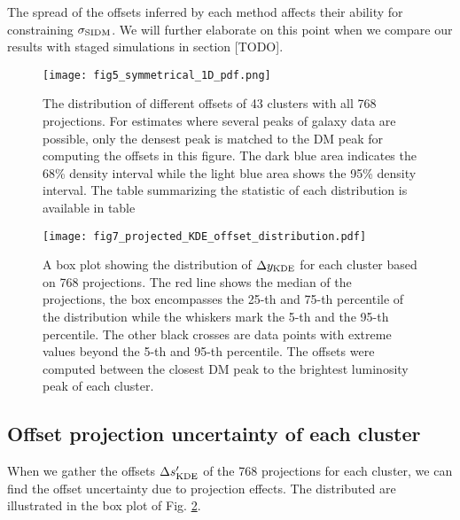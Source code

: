 The spread of the offsets inferred by each method affects their ability
for constraining $\sigma_{\rm SIDM}$. We will further elaborate on this point
when we compare our results with staged simulations in section [TODO]. 

\begin{figure*}
	\begin{center}
	\texttt{[image: fig5\_symmetrical\_1D\_pdf.png]}
	\caption{ 		
		The distribution of different offsets of 43 clusters with all 768
		projections. For estimates where several peaks of galaxy data are 
		possible, only the densest peak is matched to the DM peak for computing
		the offsets in this figure. 
		The dark blue area indicates the 68\% density interval
		while the light blue area shows the 95\% density interval. 
		The table summarizing the statistic of each distribution is available in
		table 
		\label{fig:offset_distributions}
	}
\end{center}
\end{figure*}

\begin{figure*}
	\begin{center}
	\texttt{[image: fig7\_projected\_KDE\_offset\_distribution.pdf]}
	\caption{A box plot showing the distribution of $\Delta y_{\rm KDE}$ for each cluster 
		based on 768 projections. The red line shows the median of the projections,
		the box encompasses the 25-th and 75-th percentile of the distribution while
		the whiskers mark the 5-th and the 95-th percentile. The other black crosses
		are data points with extreme values beyond the 5-th and 95-th percentile.
		The offsets were computed between the closest DM 
		peak to the brightest luminosity peak of each cluster. 		
		\label{fig:projected_KDE_offset_distribution}
	}
\end{center}
\end{figure*}

\subsection{Offset projection uncertainty of each cluster}
When we gather the offsets $\Delta s_{\rm KDE}'$ of the 
768 projections for each cluster,
we can find the offset uncertainty due to projection effects.
The distributed are illustrated in the box plot of Fig. 
\ref{fig:projected_KDE_offset_distribution}.

